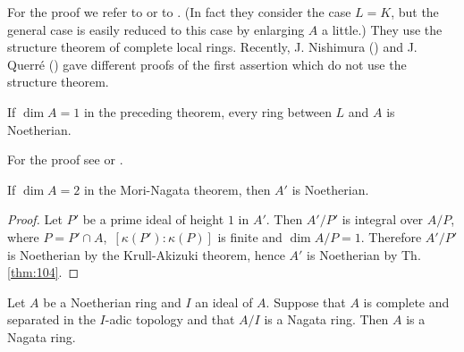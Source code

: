 \documentclass[../main]{subfiles}
\begin{document}
For the proof we refer to \cite{nagata1975local} or to \cite{fossum2012divisor}. (In fact they consider the case $L=K$, but the general case is easily reduced to this case by enlarging $A$ a little.) They use the structure theorem of complete local rings. Recently, J. Nishimura (\cite{nishimura1976note}) and J. Querr\'e (\cite{querre1977on}) gave different proofs of the first assertion which do not use the structure theorem. 

\begin{partheorem*}
If $\dim A=1$ in the preceding theorem, every ring between $L$ and $A$ is Noetherian.
\end{partheorem*}

For the proof see \cite[ch.7]{bourbaki1998commutative} or \cite{matijevic1976maximal}.

\begin{theorem}\label{thm:105}
If $\dim A=2$ in the Mori-Nagata theorem, then $A'$ is Noetherian.
\end{theorem}

\begin{proof}
Let $P'$ be a prime ideal of height $1$ in $A'$. Then $A' / P'$ is integral over $A / P$, where $P=P' \cap A$, $\,[\kappa(P'): \kappa(P)]$ is finite and $\dim A / P=1$. Therefore $A' / P'$ is Noetherian by the Krull-Akizuki theorem, hence $A'$ is Noetherian by Th.\ref{thm:104}.
\end{proof}

\begin{partheorem}[J. Marot]\label{thm:106}
Let $A$ be a Noetherian ring and $I$ an ideal of $A$. Suppose that $A$ is complete and separated in the $I$-adic topology and that $A/I$ is a Nagata ring. Then $A$ is a Nagata ring.
\end{partheorem}
\end{document}
